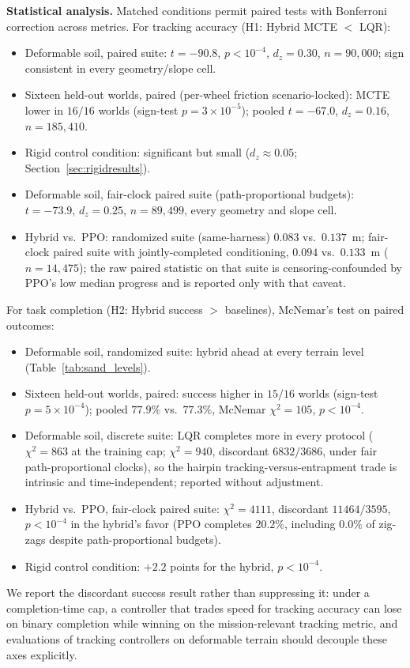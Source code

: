 \documentclass[conference]{IEEEtran}
\begin{document}
\vspace{1mm}
\noindent\textbf{Statistical analysis.} Matched conditions permit paired tests with Bonferroni correction across metrics. For tracking accuracy (H1: Hybrid MCTE $<$ LQR):
\begin{itemize}
\item Deformable soil, paired suite: $t = -90.8$, $p < 10^{-4}$, $d_z = 0.30$, $n = 90{,}000$; sign consistent in every geometry/slope cell.
\item Sixteen held-out worlds, paired (per-wheel friction scenario-locked): MCTE lower in $16/16$ worlds (sign-test $p = 3\times10^{-5}$); pooled $t = -67.0$, $d_z = 0.16$, $n = 185{,}410$.
\item Rigid control condition: significant but small ($d_z \approx 0.05$; Section~\ref{sec:rigidresults}).
\item Deformable soil, fair-clock paired suite (path-proportional budgets): $t = -73.9$, $d_z = 0.25$, $n = 89{,}499$, every geometry and slope cell.
\item Hybrid vs.\ PPO: randomized suite (same-harness) $0.083$ vs.\ $0.137$~m; fair-clock paired suite with jointly-completed conditioning, $0.094$ vs.\ $0.133$~m ($n = 14{,}475$); the raw paired statistic on that suite is censoring-confounded by PPO's low median progress and is reported only with that caveat.
\end{itemize}
For task completion (H2: Hybrid success $>$ baselines), McNemar's test on paired outcomes:
\begin{itemize}
\item Deformable soil, randomized suite: hybrid ahead at every terrain level (Table~\ref{tab:sand_levels}).
\item Sixteen held-out worlds, paired: success higher in $15/16$ worlds (sign-test $p = 5\times10^{-4}$); pooled $77.9\%$ vs.\ $77.3\%$, McNemar $\chi^2 = 105$, $p < 10^{-4}$.
\item Deformable soil, discrete suite: LQR completes more in every protocol ($\chi^2 = 863$ at the training cap; $\chi^2 = 940$, discordant $6832/3686$, under fair path-proportional clocks), so the hairpin tracking-versus-entrapment trade is intrinsic and time-independent; reported without adjustment.
\item Hybrid vs.\ PPO, fair-clock paired suite: $\chi^2 = 4111$, discordant $11464/3595$, $p < 10^{-4}$ in the hybrid's favor (PPO completes $20.2\%$, including $0.0\%$ of zig-zags despite path-proportional budgets).
\item Rigid control condition: $+2.2$ points for the hybrid, $p<10^{-4}$.
\end{itemize}
We report the discordant success result rather than suppressing it: under a completion-time cap, a controller that trades speed for tracking accuracy can lose on binary completion while winning on the mission-relevant tracking metric, and evaluations of tracking controllers on deformable terrain should decouple these axes explicitly.
\end{document}
